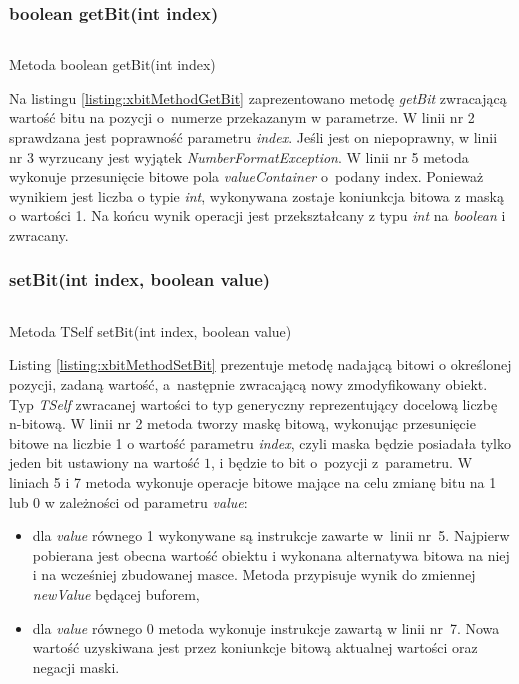 \subsubsection{boolean getBit(int index)}

\begin{listing}[h]
	\inputminted{java}{listings/xbit/xbitMethodGetBit.java}
	\caption{Metoda boolean getBit(int index)}
	\label{listing:xbitMethodGetBit}
\end{listing}
Na listingu \ref{listing:xbitMethodGetBit} zaprezentowano metodę \emph{getBit} zwracającą wartość bitu na pozycji o~numerze przekazanym w parametrze. W linii nr 2 sprawdzana jest poprawność parametru \emph{index}. Jeśli jest on niepoprawny, w linii nr 3 wyrzucany jest wyjątek \emph{NumberFormatException}. W linii nr 5 metoda wykonuje przesunięcie bitowe pola \emph{valueContainer} o~podany index. Ponieważ wynikiem jest liczba o typie \emph{int}, wykonywana zostaje koniunkcja bitowa z maską o wartości 1. Na końcu wynik operacji jest przekształcany z typu \emph{int} na \emph{boolean} i zwracany.


\subsubsection{setBit(int index, boolean value)}
\begin{listing}[h]
	\inputminted{java}{listings/xbit/xbitMethodSetBit.java}
	\caption{Metoda TSelf setBit(int index, boolean value)}
	\label{listing:xbitMethodSetBit}
\end{listing}	
Listing \ref{listing:xbitMethodSetBit} prezentuje metodę nadającą bitowi o określonej pozycji, zadaną wartość, a~następnie zwracającą nowy zmodyfikowany obiekt. Typ \emph{TSelf} zwracanej wartości to typ generyczny reprezentujący docelową liczbę n-bitową. W linii nr 2 metoda tworzy maskę bitową, wykonując przesunięcie bitowe na liczbie 1 o wartość parametru \emph{index}, czyli maska będzie posiadała tylko jeden bit ustawiony na wartość $1$, i będzie to bit o~pozycji z~parametru. W liniach 5 i 7 metoda wykonuje operacje bitowe mające na celu zmianę bitu na 1 lub 0 w zależności od parametru \emph{value}:
\begin{itemize}  
	\item dla \emph{value} równego 1 wykonywane są instrukcje zawarte w~linii nr~5. Najpierw pobierana jest obecna wartość obiektu i wykonana alternatywa bitowa  na niej i na wcześniej zbudowanej masce. Metoda przypisuje wynik do zmiennej \emph{newValue} będącej buforem,
	\item dla \emph{value} równego 0 metoda wykonuje instrukcje zawartą w linii nr~7. Nowa wartość uzyskiwana jest przez koniunkcje bitową aktualnej wartości oraz negacji maski. 
\end{itemize} 

